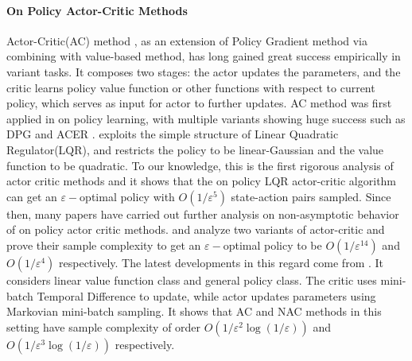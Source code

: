 \documentclass{article}
\numberwithin{equation}{section}
\begin{document}
\paragraph{On Policy Actor-Critic Methods} Actor-Critic(AC) method \cite{konda2000actor} \cite{peters2008natural}, as an extension of Policy Gradient method via combining with value-based method, has long gained great success empirically in variant tasks. It composes two stages: the actor updates the parameters, and the critic learns policy value function or other functions with respect to current policy, which serves as input for actor to further updates. AC method was first applied in on policy learning, with multiple variants showing huge success such as DPG \cite{silver2014deterministic} and ACER \cite{wang2016sample}. \cite{yang2019global} exploits the simple structure of Linear Quadratic Regulator(LQR), and restricts the policy to be linear-Gaussian and the value function to be quadratic. To our knowledge, this is the first rigorous analysis of actor critic methods and it shows that the on policy LQR actor-critic algorithm can get an $\varepsilon-$optimal policy with $O(1/\varepsilon^5)$ state-action pairs sampled. Since then, many papers have carried out further analysis on non-asymptotic behavior of on policy actor critic methods. \cite{wang2019neural} and \cite{khodadadian2021finite} analyze two variants of actor-critic and prove their sample complexity to get an $\varepsilon-$optimal policy to be $O(1/\varepsilon^{14})$ and $O(1/\varepsilon^4)$ respectively. The latest developments in this regard come from \cite{xu2020improving}. It considers linear value function class and general policy class. The critic uses mini-batch Temporal Difference to update, while actor updates parameters using Markovian mini-batch sampling. It shows that AC and NAC methods in this setting have sample complexity of order $O(1/\varepsilon^2 \log(1/\varepsilon))$ and $O(1/\varepsilon^3 \log(1/\varepsilon))$ respectively.
\end{document}
